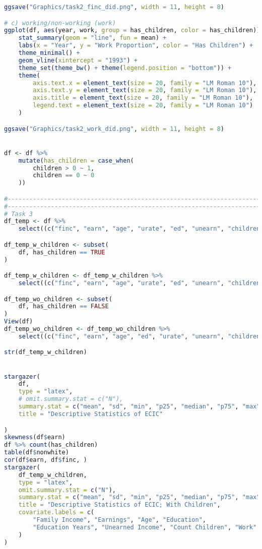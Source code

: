 \documentclass[a4paper]{article}
\begin{document}
\begin{lstlisting}[language=R]
ggsave("Graphics/task2_finc_did.png", width = 11, height = 8)

# c) working/non-working (work)
ggplot(df, aes(year, work, group = has_children, color = has_children)) +
    stat_summary(geom = "line", fun = mean) +
    labs(x = "Year", y = "Work Proportion", color = "Has Children") +
    theme_minimal() +
    geom_vline(xintercept = "1993") +
    theme_set(theme_bw() + theme(legend.position = "bottom")) +
    theme(
        axis.text.x = element_text(size = 20, family = "LM Roman 10"),
        axis.text.y = element_text(size = 20, family = "LM Roman 10"),
        axis.title = element_text(size = 20, family = "LM Roman 10"),
        legend.text = element_text(size = 20, family = "LM Roman 10")
    )

ggsave("Graphics/task2_work_did.png", width = 11, height = 8)


df <- df %>%
    mutate(has_children = case_when(
        children > 0 ~ 1,
        children == 0 ~ 0
    ))

#---------------------------------------------------------------------------------------
#---------------------------------------------------------------------------------------
# Task 3
df_temp <- df %>%
    select((c("finc", "earn", "age", "urate", "ed", "unearn", "children", "work")))

df_temp_w_children <- subset(
    df, has_children == TRUE
)

df_temp_w_children <- df_temp_w_children %>%
    select((c("finc", "earn", "age", "urate", "ed", "unearn", "children", "work")))

df_temp_wo_children <- subset(
    df, has_children == FALSE
)
View(df)
df_temp_wo_children <- df_temp_wo_children %>%
    select((c("finc", "earn", "age", "ed", "urate", "unearn", "children", "work")))

str(df_temp_w_children)


stargazer(
    df,
    type = "latex",
    # omit.summary.stat = c("N"),
    summary.stat = c("mean", "sd", "min", "p25", "median", "p75", "max"),
    title = "Descriptive Statistics of ECIC"

)
skewness(df$earn)
df %>% count(has_children)
table(df$nonwhite)
cor(df$earn, df$finc, )
stargazer(
    df_temp_w_children,
    type = "latex",
    omit.summary.stat = c("N"),
    summary.stat = c("mean", "sd", "min", "p25", "median", "p75", "max"),
    title = "Descriptive Statistics of ECIC; With Children",
    covariate.labels = c(
        "Family Income", "Earnings", "Age", "Education",
        "Education Years", "Unearned Income", "Count Children", "Work"
    )
)


\end{lstlisting}
\end{document}
